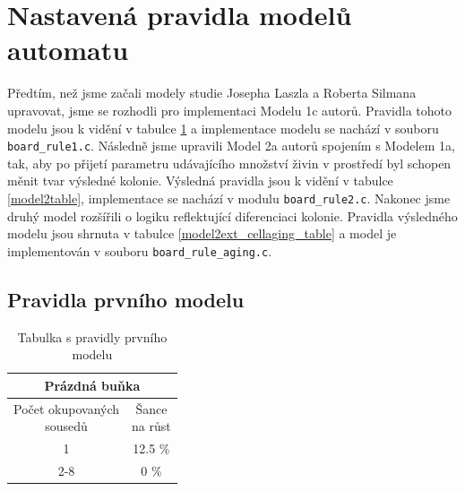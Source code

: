 \documentclass{article}
\begin{document}
\section{Nastavená pravidla modelů automatu}
Předtím, než jsme začali modely studie Josepha Laszla a Roberta Silmana \cite{solidSubstrates} upravovat, jsme se rozhodli pro implementaci Modelu 1c autorů. Pravidla tohoto modelu jsou k vidění v tabulce \ref{model1table} a implementace modelu se nachází v souboru \verb|board_rule1.c|. Následně jsme upravili Model 2a autorů spojením s Modelem 1a, tak, aby po přijetí parametru udávajícího množství živin v prostředí byl schopen měnit tvar výsledné kolonie. Výsledná pravidla jsou k vidění v tabulce \ref{model2table}, implementace se nachází v modulu \verb|board_rule2.c|. Nakonec jsme druhý model rozšířili o logiku reflektující diferenciaci kolonie. Pravidla výsledného modelu jsou shrnuta v tabulce \ref{model2ext_cellaging_table} a model je implementován v souboru \verb|board_rule_aging.c|.

\subsection{Pravidla prvního modelu}

\begin{table}[H]
    \centering
    \begin{tabular}{|c|c|} \hline
        \multicolumn{2}{|c|}{\textbf{Prázdná buňka}}                    \\ \hline
        \thead{Počet okupovaných \\ sousedů} & \thead{Šance \\ na růst} \\ \hline
         1                          &  12.5 \%                          \\ \hline
         2-8                        &     0 \%                          \\ \hline
    \end{tabular}
    \caption{Tabulka s pravidly prvního modelu}
    \label{model1table}
\end{table}
\end{document}
